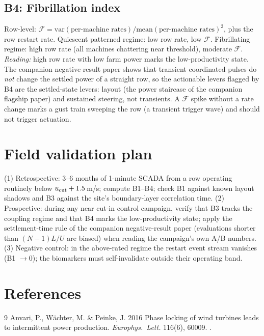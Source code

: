 \documentclass[11pt]{article}
\begin{document}
\subsection{B4: Fibrillation index}
Row-level: $\mathcal{F} = \mathrm{var}(\text{per-machine rates}) /
\mathrm{mean}(\text{per-machine rates})^2$, plus the row restart rate. Quiescent patterned
regime: low row rate, low $\mathcal{F}$. Fibrillating regime: high row rate (all machines
chattering near threshold), moderate $\mathcal{F}$. \emph{Reading:} high row rate with low
farm power marks the low-productivity state. The companion negative-result paper shows that
transient coordinated pulses do \emph{not} change the settled power of a straight row, so
the actionable levers flagged by B4 are the settled-state levers: layout (the power
staircase of the companion flagship paper) and sustained steering, not transients. A
$\mathcal{F}$ spike without a rate change marks a gust train sweeping the row (a transient
trigger wave) and should not trigger actuation.

\section{Field validation plan}

(1) Retrospective: 3--6 months of 1-minute SCADA from a row operating routinely below
$u_{\rm cut}+1.5$\,m/s; compute B1--B4; check B1 against known layout shadows and B3
against the site's boundary-layer correlation time. (2) Prospective: during any near cut-in
control campaign, verify that B3 tracks the coupling regime and that B4 marks the
low-productivity state; apply the settlement-time rule of the companion negative-result
paper (evaluations shorter than $(N-1)L/U$ are biased) when reading the campaign's own
A/B numbers. (3) Negative control: in the above-rated regime the restart event stream
vanishes (B1 $\to 0$); the biomarkers must self-invalidate outside their operating band.

\section*{References}
\begin{thebibliography}{9}
 Anvari, P., W\"achter, M. \& Peinke, J. 2016 Phase locking of wind turbines leads to intermittent power production. \emph{Europhys.\ Lett.} 116(6), 60009. .
\end{thebibliography}
\end{document}
